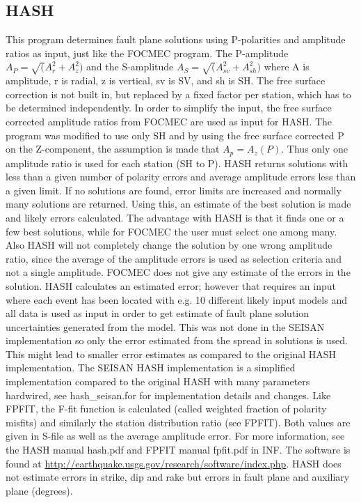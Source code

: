 
\subsection{HASH}
\label{HASH}

This program \citep{hardebeck2002,hardebeck2003} determines fault plane 
solutions using P-polarities and amplitude ratios as input, just like 
the FOCMEC program. The P-amplitude 
$A_P=\sqrt(A_r^2+A_z^2)$
 and the S-amplitude 
$A_S=\sqrt(A_{sv}^2+A_{sh}^2)$
 where A 
is amplitude, r is radial, z is vertical, sv is SV, and sh is SH. 
The free surface correction is not built in, but replaced by a fixed 
factor per station, which has to be determined independently. In order 
to simplify the input, the free surface corrected amplitude ratios 
from FOCMEC are used as input for HASH. The program was modified 
to use only SH and by using the free surface corrected P on the Z-component, 
the assumption is made that $A_p = A_z(P)$. Thus only one amplitude 
ratio is used for each station (SH to P). HASH returns solutions with 
less than a given number of polarity errors and average amplitude 
errors less than a given limit. If no solutions are found, error limits 
are increased and normally many solutions are returned. Using this, 
an estimate of the best solution is made and likely errors calculated. 
The advantage with HASH is that it finds one or a few best solutions, 
while for FOCMEC the user must select one among many. Also HASH will 
not completely change the solution by one wrong amplitude ratio, since 
the average of the amplitude errors is used as selection criteria and 
not a single amplitude. FOCMEC does not give any estimate of the errors 
in the solution. HASH calculates an estimated error; however that requires 
an input where each event has been located with e.g. 10 different likely 
input models and all data is used as input in order to get estimate of 
fault plane solution uncertainties generated from the model. This was 
not done in the SEISAN implementation so only the error estimated from 
the spread in solutions is used.  This might lead to smaller error estimates 
as compared to the original HASH implementation. The SEISAN HASH implementation 
is a simplified implementation compared to the original HASH with many 
parameters hardwired, see hash\_seisan.for for implementation details and 
changes. Like FPFIT, the F-fit function is calculated (called weighted 
fraction of polarity misfits) and similarly the station distribution 
ratio (see FPFIT). Both values are given in S-file as well as the average 
amplitude error. For more information, see the HASH manual hash.pdf 
and FPFIT manual fpfit.pdf in INF. The software is found at 
\url{http://earthquake.usgs.gov/research/software/index.php}.
HASH does 
not estimate errors in strike, dip and rake but errors in fault plane and auxiliary plane (degrees). 

